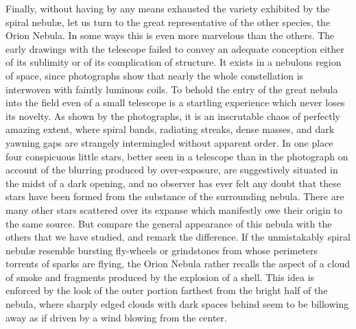 Finally, without having by any means exhausted the variety exhibited
by the spiral nebul{\ae}, let us turn to the great representative of
the other species, the Orion Nebula. In some ways this is even more
marvelous than the others. The early drawings with the telescope failed
to convey an adequate conception either of its sublimity or of its
complication of structure. It exists in a nebulous region of space,
since photographs show that nearly the whole constellation is
interwoven with faintly luminous coils. To behold the entry of the
great nebula into the field even of a small telescope is a startling
experience which never loses its novelty. As shown by the photographs,
it is an inscrutable chaos of perfectly amazing extent, where spiral
bands, radiating streaks, dense masses, and dark yawning gaps are
strangely intermingled without apparent order. In one place four
conspicuous little stars, better seen in a telescope than in the
photograph on account of the blurring produced by over-exposure, are
suggestively situated in the midst of a dark opening, and no observer
has ever felt any doubt that these stars have been formed from the
substance of the surrounding nebula. There are many other stars
scattered over its expanse which manifestly owe their origin to the
same source. But compare the general appearance of this nebula with
the others that we have studied, and remark the difference. If the
unmistakably spiral nebul{\ae} resemble bursting fly-wheels or
grindstones from whose perimeters torrents of sparks are flying, the
Orion Nebula rather recalls the aspect of a cloud of smoke and
fragments produced by the explosion of a shell. This idea is enforced
by the look of the outer portion farthest from the bright half of the
nebula, where sharply edged clouds with dark spaces behind seem to be
billowing away as if driven by a wind blowing from the center.



